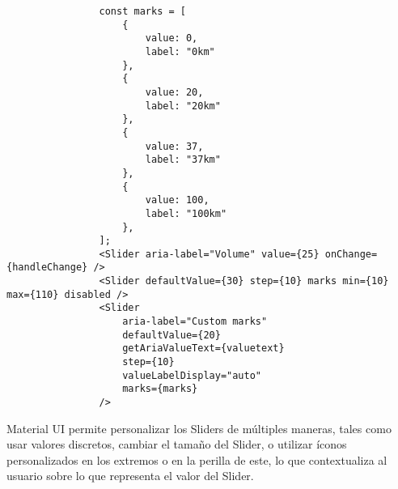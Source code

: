 \begin{itemize}
        \begin{lstlisting}
                const marks = [
                    {
                        value: 0,
                        label: "0km"
                    },
                    {
                        value: 20,
                        label: "20km"
                    },
                    {
                        value: 37,
                        label: "37km"
                    },
                    {
                        value: 100,
                        label: "100km"
                    },
                ];
                <Slider aria-label="Volume" value={25} onChange={handleChange} />
                <Slider defaultValue={30} step={10} marks min={10} max={110} disabled />
                <Slider
                    aria-label="Custom marks"
                    defaultValue={20}
                    getAriaValueText={valuetext}
                    step={10}
                    valueLabelDisplay="auto"
                    marks={marks}
                />
            \end{lstlisting}

        Material UI permite personalizar los Sliders de múltiples maneras, tales como usar valores discretos, cambiar el tamaño del Slider, o utilizar íconos personalizados en los extremos o en la perilla de este, lo que contextualiza al usuario sobre lo que representa el valor del Slider.

\end{itemize}

